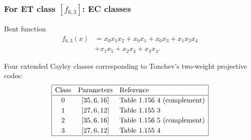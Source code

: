 \documentclass[pdf,sprung,slideColor,nocolorBG]{beamer}
\newenvironment{colortheme}[1]{
\def\ProvidesPackageRCS $##1${\relax}
\renewcommand{\ProcessOptions}{\relax}
\makeatletter

\makeatother
}{}
\begin{document}
\begin{colortheme}{jubata}
\begin{frame}
\begin{figure}
\begin{minipage}{.48\textwidth}
  \label{fig:6_2_bent_cayley_graph_index_matrix}
\end{minipage}
\end{figure}
\end{frame}
\begin{frame}
\frametitle{For ET class $[f_{6,3}]$: EC classes}

Bent function
\begin{align*}
f_{6,3}(x) &= x_{0} x_{1} x_{2} + x_{0} x_{1} + x_{0} x_{3} + x_{1} x_{3} x_{4}
\\
           &+ x_{1} x_{5} + x_{2} x_{4} + x_{3} x_{4}.
\end{align*}

Four extended Cayley classes corresponding to Tonchev's two-weight projective codes:
\begin{align*}
\def\arraystretch{1.2}
\begin{array}{|ccl|}
\hline
\text{Class} &
\text{Parameters} & \text{Reference}
\\
\hline
0 & [35,6,16] & \text{Table 1.156 4 (complement)}
\\
1 & [27,6,12] & \text{Table 1.155 3 }
\\
2 & [35,6,16] & \text{Table 1.156 5 (complement)}
\\
3 & [27,6,12] & \text{Table 1.155 4 }
\\
\hline
\end{array}
\end{align*}


\end{frame}
\end{colortheme}
\end{document}
